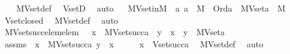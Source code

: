 \begin{isabellebody}
%
\isadelimproof
\ \ %
\endisadelimproof
%
\isatagproof
{}\isamarkupfalse%
\ MVset{\isacharunderscore}{\kern0pt}def\ \isamarkupfalse%
\ VsetD\ \isamarkupfalse%
\ auto%
\endisatagproof
{\isafoldproof}%
%
\isadelimproof
\ \isanewline
%
\endisadelimproof
\isanewline
{}\isamarkupfalse%
\ MVset{\isacharunderscore}{\kern0pt}in{\isacharunderscore}{\kern0pt}M\ {\isacharcolon}{\kern0pt}\ {\isachardoublequoteopen}{\isasymAnd}a{\isachardot}{\kern0pt}\ a\ {\isasymin}\ M\ {\isasymLongrightarrow}\ Ord{\isacharparenleft}{\kern0pt}a{\isacharparenright}{\kern0pt}\ {\isasymLongrightarrow}\ MVset{\isacharparenleft}{\kern0pt}a{\isacharparenright}{\kern0pt}\ {\isasymin}\ M{\isachardoublequoteclose}\ \isanewline
%
\isadelimproof
\ \ %
\endisadelimproof
%
\isatagproof
{}\isamarkupfalse%
\ Vset{\isacharunderscore}{\kern0pt}closed\ \isamarkupfalse%
\ MVset{\isacharunderscore}{\kern0pt}def\ \isamarkupfalse%
\ auto%
\endisatagproof
{\isafoldproof}%
%
\isadelimproof
\ \isanewline
%
\endisadelimproof
\isanewline
{}\isamarkupfalse%
\ MVset{\isacharunderscore}{\kern0pt}succ{\isacharunderscore}{\kern0pt}elem{\isacharunderscore}{\kern0pt}elem\ {\isacharcolon}{\kern0pt}\ {\isachardoublequoteopen}\ x\ {\isasymin}\ MVset{\isacharparenleft}{\kern0pt}succ{\isacharparenleft}{\kern0pt}a{\isacharparenright}{\kern0pt}{\isacharparenright}{\kern0pt}\ {\isasymLongrightarrow}\ y\ {\isasymin}\ x\ {\isasymLongrightarrow}\ y\ {\isasymin}\ MVset{\isacharparenleft}{\kern0pt}a{\isacharparenright}{\kern0pt}{\isachardoublequoteclose}\ \isanewline
%
\isadelimproof
%
\endisadelimproof
%
\isatagproof
{}\isamarkupfalse%
\ {\isacharminus}{\kern0pt}\ \isanewline
\ \ \isamarkupfalse%
\ assms\ {\isacharcolon}{\kern0pt}\ {\isachardoublequoteopen}x\ {\isasymin}\ MVset{\isacharparenleft}{\kern0pt}succ{\isacharparenleft}{\kern0pt}a{\isacharparenright}{\kern0pt}{\isacharparenright}{\kern0pt}{\isachardoublequoteclose}\ {\isachardoublequoteopen}y\ {\isasymin}\ x{\isachardoublequoteclose}\isanewline
\ \ \isamarkupfalse%
\ \isamarkupfalse%
\ {\isachardoublequoteopen}x\ {\isasymin}\ Vset{\isacharparenleft}{\kern0pt}succ{\isacharparenleft}{\kern0pt}a{\isacharparenright}{\kern0pt}{\isacharparenright}{\kern0pt}{\isachardoublequoteclose}\ \isamarkupfalse%
\ MVset{\isacharunderscore}{\kern0pt}def\ \isamarkupfalse%
\ auto\ \isanewline
\ \ \isamarkupfalse%
\ \isamarkupfalse%

\end{isabellebody}
